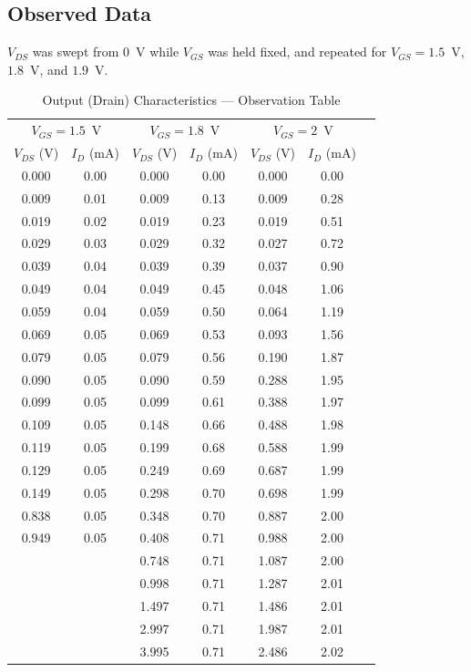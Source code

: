 \documentclass[12pt,a4paper]{article}
\begin{document}
\subsection{Observed Data}
$V_{DS}$ was swept from 0~V while $V_{GS}$ was held fixed, and repeated for $V_{GS} = 1.5$~V, $1.8$~V, and $1.9$~V.

\begin{table}[H]
\centering
\caption{Output (Drain) Characteristics --- Observation Table}
\begin{tabular}{@{}ccc|cc|cc@{}}
\toprule
\multicolumn{2}{c|}{$V_{GS}=1.5$~V} & \multicolumn{2}{c|}{$V_{GS}=1.8$~V} & \multicolumn{2}{c}{$V_{GS}=2$~V} \\
$V_{DS}$ (V) & $I_D$ (mA) & $V_{DS}$ (V) & $I_D$ (mA) & $V_{DS}$ (V) & $I_D$ (mA) \\
\midrule
0.000 & 0.00 & 0.000 & 0.00 & 0.000 & 0.00 \\
0.009 & 0.01 & 0.009 & 0.13 & 0.009 & 0.28 \\
0.019 & 0.02 & 0.019 & 0.23 & 0.019 & 0.51 \\
0.029 & 0.03 & 0.029 & 0.32 & 0.027 & 0.72 \\
0.039 & 0.04 & 0.039 & 0.39 & 0.037 & 0.90 \\
0.049 & 0.04 & 0.049 & 0.45 & 0.048 & 1.06 \\
0.059 & 0.04 & 0.059 & 0.50 & 0.064 & 1.19 \\
0.069 & 0.05 & 0.069 & 0.53 & 0.093 & 1.56 \\
0.079 & 0.05 & 0.079 & 0.56 & 0.190 & 1.87 \\
0.090 & 0.05 & 0.090 & 0.59 & 0.288 & 1.95 \\
0.099 & 0.05 & 0.099 & 0.61 & 0.388 & 1.97 \\
0.109 & 0.05 & 0.148 & 0.66 & 0.488 & 1.98 \\
0.119 & 0.05 & 0.199 & 0.68 & 0.588 & 1.99 \\
0.129 & 0.05 & 0.249 & 0.69 & 0.687 & 1.99 \\
0.149 & 0.05 & 0.298 & 0.70 & 0.698 & 1.99 \\
0.838 & 0.05 & 0.348 & 0.70 & 0.887 & 2.00 \\
0.949 & 0.05 & 0.408 & 0.71 & 0.988 & 2.00 \\
      &      & 0.748 & 0.71 & 1.087 & 2.00 \\
      &      & 0.998 & 0.71 & 1.287 & 2.01 \\
      &      & 1.497 & 0.71 & 1.486 & 2.01 \\
      &      & 2.997 & 0.71 & 1.987 & 2.01 \\
      &      & 3.995 & 0.71 & 2.486 & 2.02 \\
\bottomrule
\end{tabular}
\end{table}
\end{document}
